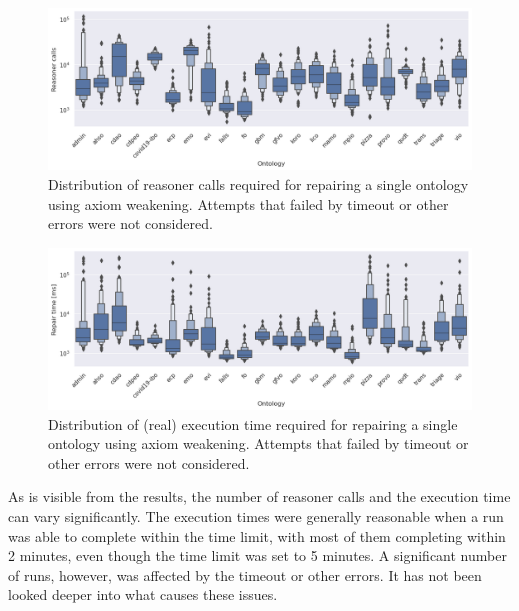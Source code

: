 \begin{figure}[ht]
  \centering
  \includegraphics[width=\textwidth]{resources/calls-ontology-violin.png}
  \caption{Distribution of reasoner calls required for repairing a single ontology using axiom weakening. Attempts that failed by timeout or other errors were not considered.}
  \label{fig:results-perf-calls}
\end{figure}

\begin{figure}[ht]
  \centering
  \includegraphics[width=\textwidth]{resources/time-ontology-violin.png}
  \caption{Distribution of (real) execution time required for repairing a single ontology using axiom weakening. Attempts that failed by timeout or other errors were not considered.}
  \label{fig:results-perf-time}
\end{figure}

As is visible from the results, the number of reasoner calls and the execution time can vary significantly. The execution times were generally reasonable when a run was able to complete within the time limit, with most of them completing within 2 minutes, even though the time limit was set to 5 minutes. A significant number of runs, however, was affected by the timeout or other errors. It has not been looked deeper into what causes these issues.

